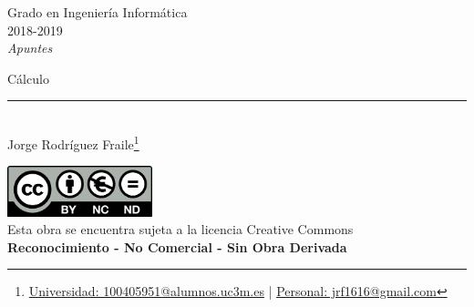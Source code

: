 \documentclass[12pt, twoside, openright]{report} %
\begin{document}
	
\begin{titlepage}
	\begin{sffamily}
	\color{azulUC3M}
	\begin{center}
		\begin{figure}[H] %
		\end{figure}
		\vspace{2.5cm}
		\begin{Large}
			Grado en Ingeniería Informática\\			
			2018-2019\\
			\vspace{2cm}		
			\textsl{Apuntes}\\
			\bigskip
		\end{Large}
		 	{\Huge Cálculo}\\
		 	\vspace*{0.5cm}
	 		\rule{10.5cm}{0.1mm}\\
			\vspace*{0.9cm}
			{\LARGE Jorge Rodríguez Fraile\footnote{\href{mailto:100405951@alumnos.uc3m.es}{Universidad: 100405951@alumnos.uc3m.es}  |  \href{mailto:jrf1616@gmail.com}{Personal: jrf1616@gmail.com}}}\\ 
			\vspace*{1cm}
	\end{center}
	\vfill
	\color{black}
		\includegraphics[width=4.2cm]{img/creativecommons.png}\\
		Esta obra se encuentra sujeta a la licencia Creative Commons\\ \textbf{Reconocimiento - No Comercial - Sin Obra Derivada}
	\end{sffamily}
\end{titlepage}


\tableofcontents
\thispagestyle{fancy}
\end{document}
